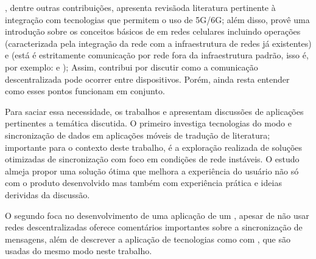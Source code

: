  \cite{fasihi2025d2d}, dentre outras contribuições, apresenta revisãoda literatura pertinente à integração  com tecnologias que permitem o uso de 5G/6G; além disso, provê uma introdução sobre os conceitos básicos de  em redes celulares incluindo operações  (caracterizada pela integração da rede  com a infraestrutura de redes já existentes) e  (está é estritamente comunicação por rede fora da infraestrutura padrão, isso é, por exemplo:  e ); Assim, contribui por discutir como a comunicação descentralizada pode ocorrer entre dispositivos. Porém, ainda resta entender como esses pontos funcionam em conjunto.

Para saciar essa necessidade, os trabalhos  \cite{wang2024optimizing} e  \cite{Guda2025OfflineFirstAndroidChat} apresentam discussões de aplicações pertinentes a temática discutida. O primeiro investiga tecnologias do modo  e sincronização de dados em aplicações móveis de tradução de literatura; importante para o contexto deste trabalho, é a exploração realizada de soluções otimizadas de sincronização com foco em condições de rede instáveis. O estudo almeja propor uma solução ótima que melhora a experiência do usuário não só com o produto desenvolvido mas também com experiência prática e ideias derividas da discussão.

O segundo foca no desenvolvimento de uma aplicação  de um , apesar de não usar redes descentralizadas oferece comentários importantes sobre a sincronização de mensagens, além de descrever a aplicação de tecnologias como  com , que são usadas do mesmo modo neste trabalho.

